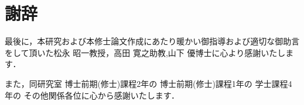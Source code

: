 \chapter*{謝辞}

最後に，本研究および本修士論文作成にあたり暖かい御指導および適切な御助言をして頂いた松永 昭一教授，高田 寛之助教,山下 優博士に心より感謝いたします．

また，同研究室
博士前期(修士)課程2年の
博士前期(修士)課程1年の
学士課程4年の
その他関係各位に心から感謝いたします．
